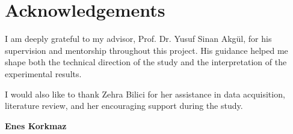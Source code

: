 \chapter*{Acknowledgements}

I am deeply grateful to my advisor, Prof. Dr. Yusuf Sinan Akgül, for his supervision and mentorship throughout this project. His guidance helped me shape both the technical direction of the study and the interpretation of the experimental results.

I would also like to thank Zehra Bilici for her assistance in data acquisition, literature review, and her encouraging support during the study.

\vspace{1cm}
\begin{flushright}
\textbf{Enes Korkmaz}
\end{flushright}
\clearpage

